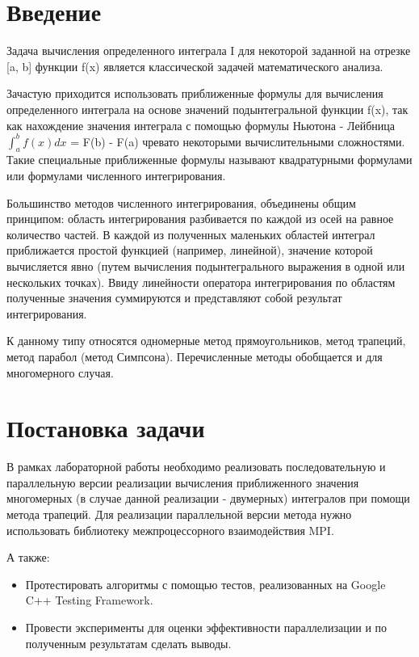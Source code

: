 \documentclass{report}
\begin{document}
\section*{Введение}
Задача вычисления определенного интеграла I для некоторой заданной на отрезке [a, b] функции f(x) является классической задачей математического анализа.
\par Зачастую приходится использовать приближенные формулы для вычисления определенного интеграла на основе значений подынтегральной функции f(x), так как нахождение значения интеграла с помощью формулы Ньютона - Лейбница $\int_a^b f(x)dx$ = F(b) - F(a) чревато некоторыми вычислительными сложностями. Такие специальные приближенные формулы называют квадратурными формулами или формулами численного интегрирования.
\par Большинство методов численного интегрирования, объединены общим принципом: область интегрирования разбивается по каждой из осей на равное количество частей. В каждой из полученных маленьких областей интеграл приближается простой функцией (например, линейной), значение которой вычисляется явно (путем вычисления подынтегрального выражения в одной или нескольких точках). Ввиду линейности оператора интегрирования по областям полученные значения суммируются и представляют собой результат интегрирования.
\par К данному типу относятся одномерные метод прямоугольников, метод трапеций, метод парабол (метод Симпсона). Перечисленные методы обобщается и для многомерного случая.

\newpage

\section*{Постановка задачи}
В рамках лабораторной работы необходимо реализовать последовательную и параллельную версии реализации вычисления приближенного значения многомерных (в случае данной реализации - двумерных) интегралов при помощи метода трапеций. Для реализации параллельной версии метода нужно использовать библиотеку межпроцессорного взаимодействия MPI.
\par А также:
\begin{itemize}
    \item Протестировать алгоритмы с помощью тестов, реализованных на Google C++ Testing Framework. 
    \item Провести эксперименты для оценки эффективности параллелизации и по полученным результатам сделать выводы.
\end{itemize}
\end{document}
